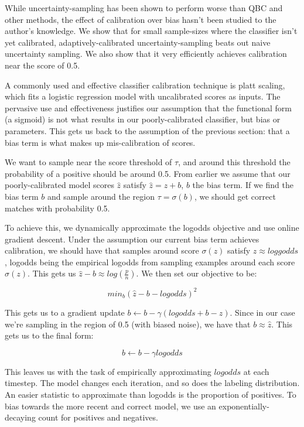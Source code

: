 \documentclass{article}
\begin{document}
While uncertainty-sampling has been shown to perform worse than QBC and other methods, the effect of calibration over bias hasn't been studied to the author's knowledge.  We show that for small sample-sizes where the classifier isn't yet calibrated, adaptively-calibrated uncertainty-sampling beats out naive uncertainty sampling.  We also show that it very efficiently achieves calibration near the score of 0.5. 

A commonly used and effective classifier calibration technique is platt scaling, which fits a logistic regression model with uncalibrated scores as inputs.  The pervasive use and effectiveness justifies our assumption that the functional form (a sigmoid) is not what results in our poorly-calibrated classifier, but bias or parameters.  This gets us back to the assumption of the previous section: that a bias term is what makes up mis-calibration of scores.  

We want to sample near the score threshold of $\tau$, and around this threshold the probability of a positive should be around 0.5.  From earlier we assume that our poorly-calibrated model scores $\hat{z}$ satisfy $\hat{z} = z+b$, $b$ the bias term.  If we find the bias term $b$ and sample around the region $\tau = \sigma(b)$, we should get correct matches with probability 0.5.  

To achieve this, we dynamically approximate the logodds objective and use online gradient descent.  Under the assumption our current bias term achieves calibration, we should have that samples around score $\sigma(z)$ satisfy $z \approx loggodds$, logodds being the empirical logodds from sampling examples around each score $\sigma(z)$.  This gets us $\hat{z}-b \approx log(\frac{p}{n})$.  We then set our objective to be:

$$min_b \left(\hat{z}-b-logodds\right)^2$$

This gets us to a gradient update $b \leftarrow b - \gamma \left( logodds+b-\hat{z} \right)$.  Since in our case we're sampling in the region of 0.5 (with biased noise), we have that $b \approx \hat{z}$.  This gets us to the final form:

$$b \leftarrow b - \gamma logodds$$

This leaves us with the task of empirically approximating $logodds$ at each timestep.  The model changes each iteration, and so does the labeling distribution.  An easier statistic to approximate than logodds is the proportion of positives.  To bias towards the more recent and correct model, we use an exponentially-decaying count for positives and negatives.  
\end{document}
